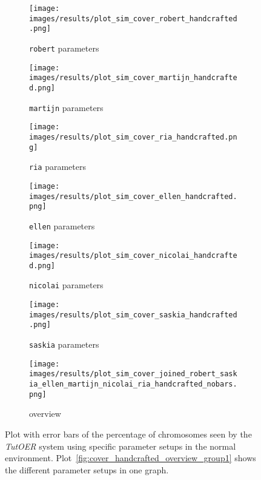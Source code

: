 \begin{figure}[ht]
	\begin{subfigure}{0.48\linewidth}
	\texttt{[image: images/results/plot\_sim\_cover\_robert\_handcrafted.png]}
	\caption{\texttt{robert} parameters}
	\label{fig:cover_handcrafted_robert}
	\end{subfigure}
	\hfill
	\begin{subfigure}{0.48\linewidth}
	\texttt{[image: images/results/plot\_sim\_cover\_martijn\_handcrafted.png]}
	\caption{\texttt{martijn} parameters}
	\label{fig:cover_handcrafted_martijn}
	\end{subfigure}
	\begin{subfigure}{0.48\linewidth}
	\texttt{[image: images/results/plot\_sim\_cover\_ria\_handcrafted.png]}
	\caption{\texttt{ria} parameters}
	\label{fig:cover_handcrafted_ria}
	\end{subfigure}
	\hfill
	\begin{subfigure}{0.48\linewidth}
	\texttt{[image: images/results/plot\_sim\_cover\_ellen\_handcrafted.png]}
	\caption{\texttt{ellen} parameters}
	\label{fig:cover_handcrafted_ellen}
	\end{subfigure}
	\begin{subfigure}{0.48\linewidth}
	\texttt{[image: images/results/plot\_sim\_cover\_nicolai\_handcrafted.png]}
	\caption{\texttt{nicolai} parameters}
	\label{fig:cover_handcrafted_nicolai}
	\end{subfigure}
	\hfill
	\begin{subfigure}{0.48\linewidth}
	\texttt{[image: images/results/plot\_sim\_cover\_saskia\_handcrafted.png]}
	\caption{\texttt{saskia} parameters}
	\label{fig:cover_handcrafted_saskia}
	\end{subfigure}
	\begin{subfigure}{\linewidth}
	\texttt{[image: images/results/plot\_sim\_cover\_joined\_robert\_saskia\_ellen\_martijn\_nicolai\_ria\_handcrafted\_nobars.png]}
	\caption{overview}
	\label{fig:cover_handcrafted_overview_group2}
	\end{subfigure}
	\caption{Plot with error bars of the percentage of chromosomes seen by the \emph{TutOER}
	system using specific parameter setups in the normal environment.
	Plot~\ref{fig:cover_handcrafted_overview_group1} shows the
	different parameter setups in one graph.}
	\label{fig:cover_handcrafted_container_group2}
\end{figure}

